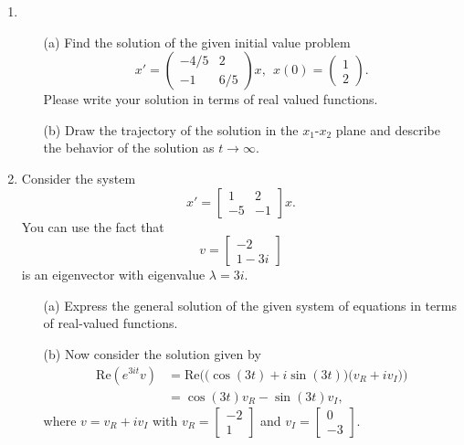 \documentclass[11pt]{article}
\theoremstyle{definition}
\begin{document}
\begin{enumerate}[leftmargin=*]
\item 

\begin{itemize}
\item[(a)] Find the solution of the given initial value problem
\[
x'= \left(
\begin{array}{cc}
-4/5 &2 \\
-1& 6/5
\end{array}\right)x, \ \ 
x(0)=
 \left(
\begin{array}{c}
1 \\
2
\end{array}\right).
\]
Please write your solution in terms of real valued functions.
\item[(b)] Draw the trajectory of the solution in the $x_1$-$x_2$ plane and describe the behavior of the solution as $t\to \infty$.  \\
\end{itemize}


\item Consider the system \[
x'=\left[
\begin{array}{cc}
1 & 2\\
-5 & -1
\end{array}\right]x.
\]
You can use the fact that 
\[
v= \left[ \begin{array}{c} -2   \\  1-3i \end{array}\right]
\]
is an eigenvector with eigenvalue $\lambda=3i$.

\begin{itemize}
\item[(a)] Express the general solution of the given system of equations in terms of real-valued functions.

\item[(b)] Now consider the solution given by
\[
\begin{array}{ll}
\mathrm{Re}(e^{3it}v) & = \mathrm{Re}\Big(\big(\cos (3t)+i\sin (3t)\big) \big(v_R+ i v_I \big)\Big)\\
 & = \cos(3t)v_R-\sin(3t)v_I,
 \end{array}
\]
where $v=v_R+i v_I$ with $v_R=\left[ \begin{array}{c}   -2  \\ 1 \end{array}\right]$ and $v_I=\left[ \begin{array}{c} 0  \\  -3 \end{array}\right]$.  


\end{itemize}
\end{enumerate}
\end{document}
